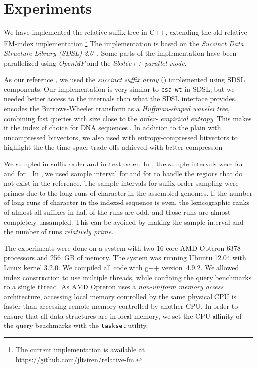 \section{Experiments}

We have implemented the relative suffix tree in C++, extending the
old relative FM-index implementation.\footnote{The current implementation is available
at \url{https://github.com/jltsiren/relative-fm}.} The implementation is based
on the \emph{Succinct Data Structure Library (SDSL) 2.0}~\cite{Gog2014b}. Some
parts of the implementation have been parallelized using \emph{OpenMP} and the
\emph{libstdc++ parallel mode}.

As our reference \CSA{}, we used the \emph{succinct suffix array} (\SSA{})
\cite{Ferragina2007a,Maekinen2005} implemented using SDSL components. Our
implementation is very similar to \texttt{csa\_wt} in SDSL, but we needed
better access to the internals than what the SDSL interface
provides. \SSA{} encodes the Burrows-Wheeler transform as a \emph{Huffman-shaped
wavelet tree}, combining fast queries with size close to the
\emph{order\nobreakdash- empirical entropy}. This makes it the
index of choice for DNA sequences \cite{Ferragina2009a}. In addition to
the plain \SSA{} with uncompressed bitvectors, we also used \SSArrr{} with
entropy-compressed bitvectors \cite{Raman2007} to highlight the
the time-space trade-offs achieved with better compression

We sampled \SA{} in suffix order and \ISA{} in text order. In \SSA, the sample
intervals were  for \SA{} and  for \ISA. In \RFM, we used sample
interval  for \SA{} and  for \ISA{} to handle the regions that do
not exist in the reference. The sample intervals for suffix order sampling
were primes due to the long runs of character  in the assembled genomes. If
the number of long runs of character  in the indexed sequence is even, the
lexicographic ranks of almost all suffixes in half of the runs are odd, and
those runs are almost completely unsampled. This can be avoided by making the
sample interval and the number of runs \emph{relatively prime}.

The experiments were done on a system with two 16\nobreakdash-core AMD Opteron 6378 processors and 256~GB of memory. The system was running Ubuntu 12.04 with Linux kernel 3.2.0. We compiled all code with g++ version~4.9.2. We allowed index construction to use multiple threads, while confining the query benchmarks to a single thread. As AMD Opteron uses a \emph{non-uniform memory access} architecture, accessing local memory controlled by the same physical CPU is faster than accessing remote memory controlled by another CPU. In order to ensure that all data structures are in local memory, we set the CPU affinity of the query benchmarks with the \texttt{taskset} utility.

